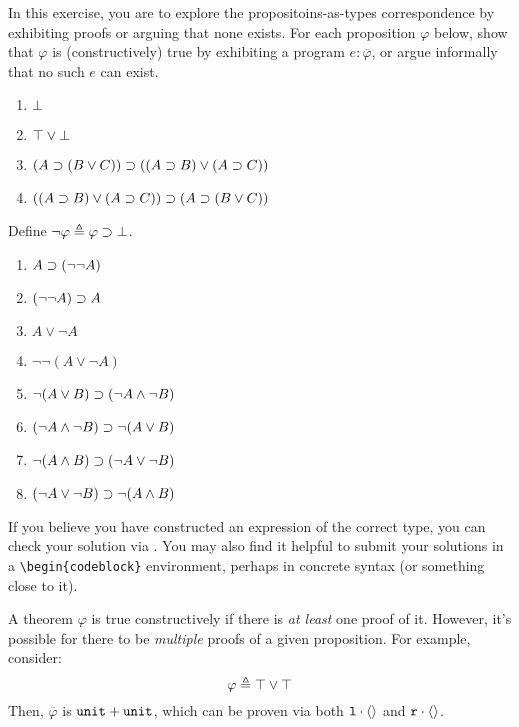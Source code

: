 \documentclass[11pt]{article}
\begin{document}
\begin{task}{24}
  In this exercise, you are to explore the propositoins-as-types correspondence by exhibiting proofs or arguing that none exists.
  For each proposition $\varphi$ below, show that $\varphi$ is (constructively) true by exhibiting a program $e : \overline{\varphi}$, or argue informally that no such $e$ can exist.

  \begin{enumerate}
    \item $\bot$
    \item $\top \lor \bot$
    \item $(A \supset (B \lor C)) \supset ((A \supset B) \lor (A \supset C))$
    \item $((A \supset B) \lor (A \supset C)) \supset (A \supset (B \lor C))$
  \end{enumerate}

  Define $\lnot \varphi \mathrel{\triangleq} \varphi \supset \bot$.

  \begin{enumerate}[resume]
    \item $A \supset (\lnot \lnot A)$
    \item $(\lnot \lnot A) \supset A$
    \item $A \lor \lnot A$
    \item $\lnot \lnot (A \lor \lnot A)$
    \item $\lnot (A \lor B) \supset (\lnot A \land \lnot B)$
    \item $(\lnot A \land \lnot B) \supset \lnot (A \lor B)$
    \item $\lnot (A \land B) \supset (\lnot A \lor \lnot B)$
    \item $(\lnot A \lor \lnot B) \supset \lnot (A \land B)$
  \end{enumerate}
\end{task}
\begin{hint}
  If you believe you have constructed an expression of the correct type, you can check your solution via .
  You may also find it helpful to submit your solutions in a \verb|\begin{codeblock}| environment, perhaps in \LangPSF{} concrete syntax (or something close to it).
\end{hint}

\begin{remark}
  A theorem $\varphi$ is true constructively if there is \emph{at least} one proof of it.
  However, it's possible for there to be \emph{multiple} proofs of a given proposition.
  For example, consider:
  \[ \varphi \mathrel{\triangleq} \top \lor \top \]
  Then, $\overline{\varphi}$ is ${\mathtt{unit}}\mathbin{+}{\mathtt{unit}}$, which can be proven via both ${\mathtt{l}}\mathbin{\cdot}{\langle\rangle}$ and ${\mathtt{r}}\mathbin{\cdot}{\langle\rangle}$.
\end{remark}
\end{document}
